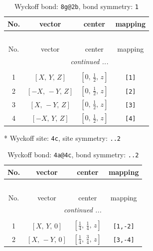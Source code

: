 \documentclass[fleqn,8pt]{jsarticle}
\begin{document}
\begin{longtable}{cccc}
\caption{Wyckoff bond: {\tt 8g@2b}, bond symmetry: {\tt 1}}
 \\
 \hline \hline
No. & vector & center & mapping \\ \hline \endfirsthead

\multicolumn{3}{l}{\tablename\ \thetable{}} \\
 \hline \hline
No. & vector & center & mapping \\ \hline \endhead

 \hline \hline
\multicolumn{3}{r}{\footnotesize\it continued ...} \\ \endfoot

 \hline \hline
\multicolumn{3}{r}{} \\ \endlastfoot

1 & $\left[ X,\, Y,\, Z \right]$ & $\left[ 0,\, \frac{1}{2},\, z \right]$ & {\tt [1]} \\ \hline
2 & $\left[ - X,\, - Y,\, Z \right]$ & $\left[ 0,\, \frac{1}{2},\, z \right]$ & {\tt [2]} \\ \hline
3 & $\left[ X,\, - Y,\, Z \right]$ & $\left[ 0,\, \frac{1}{2},\, z \right]$ & {\tt [3]} \\ \hline
4 & $\left[ - X,\, Y,\, Z \right]$ & $\left[ 0,\, \frac{1}{2},\, z \right]$ & {\tt [4]} \\
\end{longtable}
* Wyckoff site: {\tt 4c}, site symmetry: {\tt ..2}
\renewcommand{\arraystretch}{1.2}
\begin{longtable}{cccc}
\caption{Wyckoff bond: {\tt 4a@4c}, bond symmetry: {\tt ..2}}
 \\
 \hline \hline
No. & vector & center & mapping \\ \hline \endfirsthead

\multicolumn{3}{l}{\tablename\ \thetable{}} \\
 \hline \hline
No. & vector & center & mapping \\ \hline \endhead

 \hline \hline
\multicolumn{3}{r}{\footnotesize\it continued ...} \\ \endfoot

 \hline \hline
\multicolumn{3}{r}{} \\ \endlastfoot

1 & $\left[ X,\, Y,\, 0 \right]$ & $\left[ \frac{1}{4},\, \frac{1}{4},\, z \right]$ & {\tt [1,-2]} \\ \hline
2 & $\left[ X,\, - Y,\, 0 \right]$ & $\left[ \frac{1}{4},\, \frac{3}{4},\, z \right]$ & {\tt [3,-4]} \\
\end{longtable}
\end{document}
